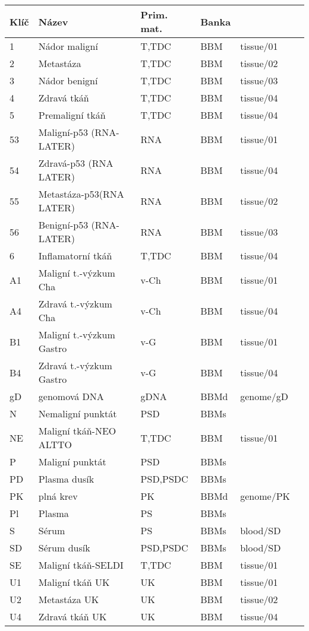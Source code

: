 \begin{table}[ht] 
\centering
\begin{tabular}{l l l l l l}
\hline 
Klíč & Název 	& Prim. mat. & Banka & \ProjectName \\ [0.5ex]  
\hline \hline
1		&	Nádor maligní							&	T,TDC		&		BBM	&	tissue/01 \\
2		&	Metastáza									&	T,TDC		&		BBM	&	tissue/02 \\
3		&	Nádor benigní							&	T,TDC		&		BBM	&	tissue/03 \\
4		&	Zdravá tkáň								&	T,TDC		&		BBM	&	tissue/04 \\
5		&	Premaligní tkáň						&	T,TDC		&		BBM	&	tissue/04 \\
53	&	Maligní-p53 (RNA-LATER)		&	RNA			&		BBM	&	tissue/01 \\
54	&	Zdravá-p53 (RNA LATER)		&	RNA			&		BBM	&	tissue/04 \\
55	&	Metastáza-p53(RNA LATER)	&	RNA			&		BBM	&	tissue/02 \\
56	&	Benigní-p53 (RNA-LATER)		&	RNA			&		BBM	&	tissue/03 \\
6		&	Inflamatorní tkáň					&	T,TDC		&		BBM	&	tissue/04 \\
A1	&	Maligní t.-výzkum Cha			&	v-Ch		&		BBM	&	tissue/01 \\
A4	&	Zdravá t.-výzkum Cha			&	v-Ch		&		BBM	&	tissue/04 \\
B1	&	Maligní t.-výzkum Gastro	&	v-G			&		BBM	&	tissue/01 \\
B4	&	Zdravá t.-výzkum Gastro		&	v-G			&		BBM	&	tissue/04 \\
gD	&	genomová DNA							&	gDNA		&		BBMd&	genome/gD \\
N		&	Nemaligní punktát					&	PSD			&		BBMs& 					\\	
NE	&	Maligní tkáň-NEO ALTTO		&	T,TDC		&		BBM	&	tissue/01 \\
P		&	Maligní punktát						&	PSD			&		BBMs&	 					\\
PD	&	Plasma dusík							&	PSD,PSDC&		BBMs&	 					\\
PK	&	plná krev									&	PK			&		BBMd&	genome/PK \\
Pl	&	Plasma										&	PS			&		BBMs& 	 				\\
S~	&	Sérum											&	PS			&		BBMs&	blood/SD 	\\
SD	&	Sérum dusík								&	PSD,PSDC&		BBMs&	blood/SD 	\\
SE	&	Maligní tkáň-SELDI				&	T,TDC		&		BBM	&	tissue/01 \\
U1	&	Maligní tkáň UK						&	UK			&		BBM	&	tissue/01 \\
U2	&	Metastáza UK							&	UK			&		BBM	&	tissue/02 \\
U4	&	Zdravá tkáň UK						&	UK			&		BBM	&	tissue/04 \\

\hline %
\end{tabular} 
\label{tab:ciselnik-muni} %
\end{table} 


